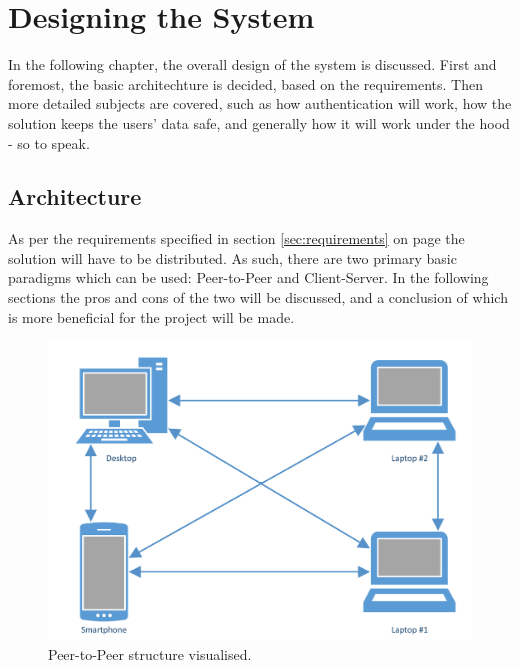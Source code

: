 \chapter{Designing the System}
	In the following chapter, the overall design of the system is discussed. First and foremost, the basic architechture is decided, based on the requirements. Then more detailed subjects are covered, such as how authentication will work, how the solution keeps the users' data safe, and generally how it will work under the hood - so to speak.

	\section{Architecture}
		\label{sec:arch}
		As per the requirements specified in section \ref{sec:requirements} on page \pageref{sec:requirements} the solution will have to be distributed. As such, there are two primary basic paradigms which can be used: Peer-to-Peer and Client-Server. In the following sections the pros and cons of the two will be discussed, and a conclusion of which is more beneficial for the project will be made.

		\begin{figure}
			\centering
			\includegraphics[width=\textwidth]{figures/design/PeerToPeer.pdf}
			\caption{Peer-to-Peer structure visualised.}
			\label{fig:peertopeer}
		\end{figure}

